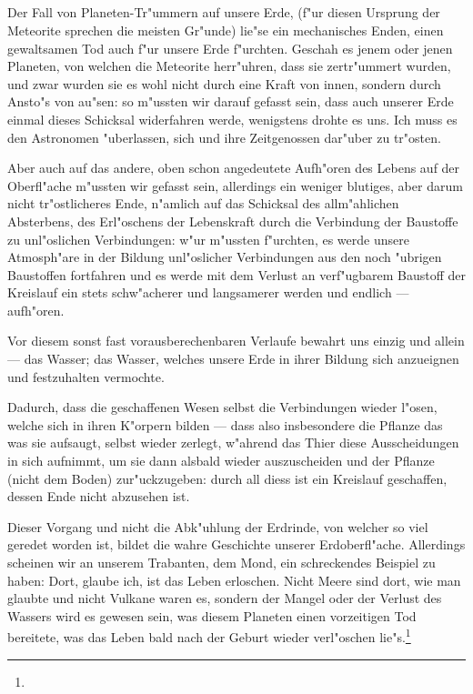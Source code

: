 \documentclass[a4paper, 11pt, oneside]{article}
\begin{document}
\subsection{}
\paragraph{}
Der Fall von Planeten-Tr"ummern auf unsere Erde, (f"ur diesen Ursprung der Meteorite sprechen die meisten Gr"unde) lie"se ein mechanisches Enden, einen gewaltsamen Tod auch f"ur unsere Erde f"urchten. Geschah es jenem oder jenen Planeten, von welchen die Meteorite herr"uhren, dass sie zertr"ummert wurden, und zwar wurden sie es wohl nicht durch eine Kraft von innen, sondern durch Ansto"s von au"sen: so m"ussten wir darauf gefasst sein, dass auch unserer Erde einmal dieses Schicksal widerfahren werde, wenigstens drohte es uns. Ich muss es den Astronomen "uberlassen, sich und ihre Zeitgenossen dar"uber zu tr"osten.

Aber auch auf das andere, oben schon angedeutete Aufh"oren des Lebens auf der Oberfl"ache m"ussten wir gefasst sein, allerdings ein weniger blutiges, aber darum nicht tr"ostlicheres Ende, n"amlich auf das Schicksal des allm"ahlichen Absterbens, des Erl"oschens der Lebenskraft durch die Verbindung der Baustoffe zu unl"oslichen Verbindungen: w"ur m"ussten f"urchten, es werde unsere Atmosph"are in der Bildung unl"oslicher Verbindungen aus den noch "ubrigen Baustoffen fortfahren und es werde mit dem Verlust an verf"ugbarem Baustoff der Kreislauf ein stets schw"acherer und langsamerer werden und endlich --- aufh"oren.

Vor diesem sonst fast vorausberechenbaren Verlaufe bewahrt uns einzig und allein --- das Wasser; das Wasser, welches unsere Erde in ihrer Bildung sich anzueignen und festzuhalten vermochte.

Dadurch, dass die geschaffenen Wesen selbst die Verbindungen wieder l"osen, welche sich in ihren K"orpern bilden --- dass also insbesondere die Pflanze das was sie aufsaugt, selbst wieder zerlegt, w"ahrend das Thier diese Ausscheidungen in sich aufnimmt, um sie dann alsbald wieder auszuscheiden und der Pflanze (nicht dem Boden) zur"uckzugeben: durch all diess ist ein Kreislauf geschaffen, dessen Ende nicht abzusehen ist.

Dieser Vorgang und nicht die Abk"uhlung der Erdrinde, von welcher so viel geredet worden ist, bildet die wahre Geschichte unserer Erdoberfl"ache. Allerdings scheinen wir an unserem Trabanten, dem Mond, ein schreckendes Beispiel zu haben: Dort, glaube ich, ist das Leben erloschen. Nicht Meere sind dort, wie man glaubte und nicht Vulkane waren es, sondern der Mangel oder der Verlust des Wassers wird es gewesen sein, was diesem Planeten einen vorzeitigen Tod bereitete, was das Leben bald nach der Geburt wieder verl"oschen lie"s.\footnote{}
\end{document}
